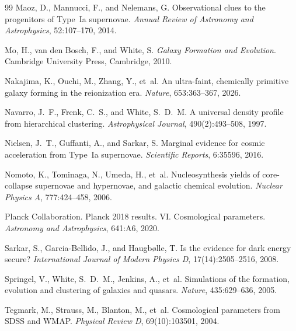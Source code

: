 \documentclass[12pt, a4paper]{article}
\theoremstyle{definition}
\begin{document}
\begin{thebibliography}{99}
Maoz, D., Mannucci, F., and Nelemans, G.
\newblock Observational clues to the progenitors of Type~Ia supernovae.
\newblock \textit{Annual Review of Astronomy and Astrophysics}, 52:107--170, 2014.

Mo, H., van den Bosch, F., and White, S.
\newblock \textit{Galaxy Formation and Evolution}.
\newblock Cambridge University Press, Cambridge, 2010.

Nakajima, K., Ouchi, M., Zhang, Y., et~al.
\newblock An ultra-faint, chemically primitive galaxy forming in the reionization era.
\newblock \textit{Nature}, 653:363--367, 2026.

Navarro, J.~F., Frenk, C.~S., and White, S.~D.~M.
\newblock A universal density profile from hierarchical clustering.
\newblock \textit{Astrophysical Journal}, 490(2):493--508, 1997.

Nielsen, J.~T., Guffanti, A., and Sarkar, S.
\newblock Marginal evidence for cosmic acceleration from Type~Ia supernovae.
\newblock \textit{Scientific Reports}, 6:35596, 2016.

Nomoto, K., Tominaga, N., Umeda, H., et~al.
\newblock Nucleosynthesis yields of core-collapse supernovae and hypernovae,
  and galactic chemical evolution.
\newblock \textit{Nuclear Physics A}, 777:424--458, 2006.

{Planck Collaboration}.
\newblock Planck 2018 results. VI. Cosmological parameters.
\newblock \textit{Astronomy and Astrophysics}, 641:A6, 2020.

Sarkar, S., Garcia-Bellido, J., and Haugb\o{}lle, T.
\newblock Is the evidence for dark energy secure?
\newblock \textit{International Journal of Modern Physics D}, 17(14):2505--2516, 2008.

Springel, V., White, S.~D.~M., Jenkins, A., et~al.
\newblock Simulations of the formation, evolution and clustering of galaxies and quasars.
\newblock \textit{Nature}, 435:629--636, 2005.

Tegmark, M., Strauss, M., Blanton, M., et~al.
\newblock Cosmological parameters from SDSS and WMAP.
\newblock \textit{Physical Review D}, 69(10):103501, 2004.


\end{thebibliography}
\end{document}
